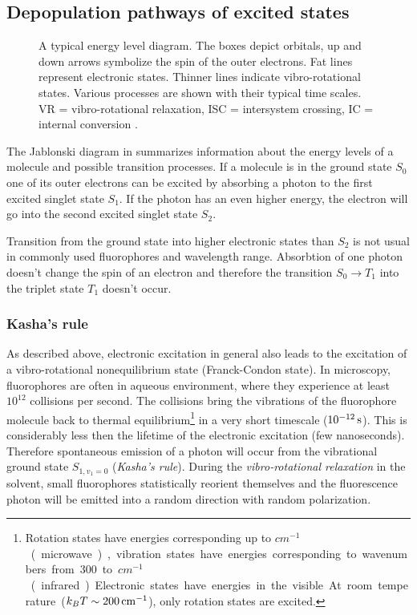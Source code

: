 \subsection{Depopulation pathways of excited states}
\begin{figure}[!hbt]
  \centering
  \def\svgscale{.8}
  
  \caption{A typical energy level diagram. The boxes depict orbitals,
    up and down arrows symbolize the spin of the outer electrons. Fat
    lines represent electronic states. Thinner lines indicate
    vibro-rotational states. Various processes are shown with their
    typical time scales. VR = vibro-rotational relaxation, ISC =
    intersystem crossing, IC = internal conversion \cite[inspired
    from][]{Haken2006}.}
  \label{fig:flu-level}
\end{figure}
The Jablonski diagram in  summarizes information
about the energy levels of a molecule and possible transition
processes. If a molecule is in the ground state $S_0$ one of its outer
electrons can be excited by absorbing a photon to the first excited
singlet state $S_1$.  If the photon has an even higher energy, the
electron will go into the second excited singlet state $S_2$.

Transition from the ground state into higher electronic states than
$S_2$ is not usual in commonly used fluorophores and wavelength range.
Absorbtion of one photon doesn't change the spin of an electron and
therefore the transition $S_0\rightarrow T_1$ into the triplet state
$T_1$ doesn't occur.

\subsubsection{Kasha's rule}
As described above, electronic excitation in general also leads to the
excitation of a vibro-rotational nonequilibrium state (Franck-Condon
state). In microscopy, fluorophores are often in aqueous environment,
where they experience at least $10^{12}$ collisions per second. The
collisions bring the vibrations of the fluorophore molecule back to
thermal equilibrium\footnote{Rotation states have energies
  corresponding up to \unit[100]{$cm^{-1}$} (microwave), vibration
  states have energies corresponding to wavenumbers from 300 to
  \unit[3000]{$cm^{-1}$} (infrared). Electronic states have energies
  in the visible. At room temperature ($k_B
  T\sim\unit[200]{cm^{-1}}$), only rotation states are excited.} in a
very short timescale ($\unit[10^{-12}]{s}$). This is considerably less
then the lifetime of the electronic excitation (few
nanoseconds). Therefore spontaneous emission of a photon will occur
from the vibrational ground state $S_{1,v_1=0}$ (\emph{Kasha's
  rule}). During the \emph{vibro-rotational relaxation} in the
solvent, small fluorophores statistically reorient themselves and the
fluorescence photon will be emitted into a random direction with
random polarization.

